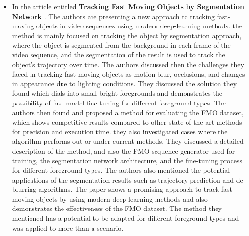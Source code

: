 \documentclass[12pt]{article}
\begin{document}
\begin{itemize}
        \item In the article entitled \textbf {Tracking Fast Moving Objects by Segmentation Network} \cite{9413129}. The authors are presenting a new approach to tracking fast-moving objects in video sequences using modern deep-learning methods. the method is mainly focused on tracking the object by segmentation approach, where the object is segmented from the background in each frame of the video sequence, and the segmentation of the result is used to track the object's trajectory over time. The authors discussed then the challenges they faced in tracking fast-moving objects as motion blur, occlusions, and changes in appearance due to lighting conditions. They discussed the solution they found which dials into small bright foregrounds and demonstrates the possibility of fast model fine-tuning for different foreground types. The authors then found and proposed a method for evaluating the FMO dataset, which shows competitive results compared to other state-of-the-art methods for precision and execution time. they also investigated cases where the algorithm performs out or under current methods. They discussed a detailed description of the method, and also the FMO sequence generator used for training,  the segmentation network architecture, and the fine-tuning process for different foreground types. The authors also mentioned the potential applications of the segmentation results such as trajectory prediction and de-blurring algorithms. The paper shows a promising approach to track fast-moving objects by using modern deep-learning methods and also demonstrates the effectiveness of the FMO dataset. The method they mentioned has a potential to be adapted for different foreground types and was applied to more than a scenario. 


\end{itemize}
\end{document}
